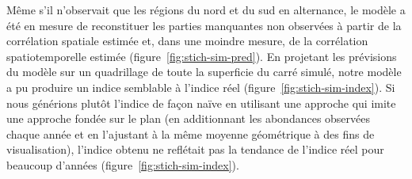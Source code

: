 \documentclass[11pt]{book}
\begin{document}
Même s'il n'observait que les régions du nord et du sud en alternance, le modèle a été en mesure de reconstituer les parties manquantes non observées à partir de la corrélation spatiale estimée et, dans une moindre mesure, de la corrélation spatiotemporelle estimée (figure~\ref{fig:stich-sim-pred}). En projetant les prévisions du modèle sur un quadrillage de toute la superficie du carré simulé, notre modèle a pu produire un indice semblable à l'indice réel (figure~\ref{fig:stich-sim-index}). Si nous générions plutôt l'indice de façon naïve en utilisant une approche qui imite une approche fondée sur le plan (en additionnant les abondances observées chaque année et en l'ajustant à la même moyenne géométrique à des fins de visualisation), l'indice obtenu ne reflétait pas la tendance de l'indice réel pour beaucoup d'années (figure~\ref{fig:stich-sim-index}).
\end{document}
